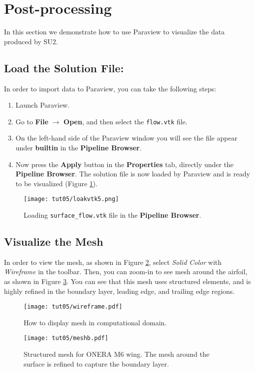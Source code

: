\section{Post-processing}
In this section we demonstrate how to use Paraview to visualize the data produced by SU2.
\subsection{Load the Solution File:}
In order to import data to Paraview, you can take the following steps:
\begin{enumerate}[label=\arabic*)]
	\setcounter{enumi}{0}
	\item Launch Paraview.
	\item Go to \textbf{File} $\rightarrow$ \textbf{Open}, and then select the \texttt{flow.vtk} file.
	\item On the left-hand side of the Paraview window you will see the file appear under \textbf{builtin} in the \textbf{Pipeline Browser}.
	\item Now press the \textbf{Apply} button in the \textbf{Properties} tab, directly under the \textbf{Pipeline Browser}. The solution file is now loaded by Paraview and is ready to be visualized (Figure \ref{fig5:load}).
\end{enumerate}
\begin{figure}[ht]
    \centering
    \texttt{[image: tut05/loakvtk5.png]}
    \caption{Loading \texttt{surface\_flow.vtk} file in the \textbf{Pipeline Browser}.}
    \label{fig5:load}
\end{figure}
\subsection{Visualize the Mesh}
In order to view the mesh, as shown in Figure \ref{fig5:wireframe}, select \textit{Solid Color} with \textit{Wireframe} in the toolbar. Then, you can zoom-in to see mesh around the airfoil, as shown in Figure \ref{fig5:mesh}. You can see that this mesh uses structured elements, and is highly refined in the boundary layer, leading edge, and trailing edge regions.
\begin{figure}[ht]
    \centering
    \texttt{[image: tut05/wireframe.pdf]}
    \caption{How to display mesh in computational domain.}
    \label{fig5:wireframe}
\end{figure}
\begin{figure}[ht]
    \centering
    \texttt{[image: tut05/meshb.pdf]}
    \caption{Structured mesh for ONERA M6 wing. The mesh around the surface is refined to capture the boundary layer.}
    \label{fig5:mesh}
\end{figure}
